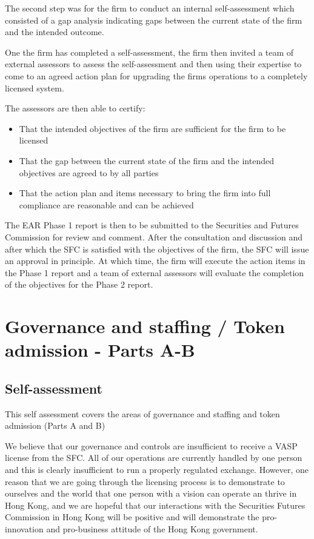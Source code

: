 \documentclass[]{report}
\begin{document}
The second step was for the firm to conduct an internal
self-assessment which consisted of a gap analysis indicating gaps
between the current state of the firm and the intended outcome.

One the firm has completed a self-assessment, the firm then invited a
team of external assessors to assess the self-assessment and then
using their expertise to come to an agreed action plan for upgrading
the firms operations to a completely licensed system.

The assessors are then able to certify:

\begin{itemize}
  \item That the intended objectives of the firm are sufficient for
    the firm to be licensed
  \item That the gap between the current state of the firm and the
    intended objectives are agreed to by all parties
  \item That the action plan and items necessary to bring the firm
    into full compliance are reasonable and can be achieved
\end{itemize}

The EAR Phase 1 report is then to be submitted to the Securities and
Futures Commission for review and comment.  After the consultation and
discussion and after which the SFC is satisfied with the objectives of
the firm, the SFC will issue an approval in principle.  At which time,
the firm will execute the action items in the Phase 1 report and a
team of external assessors will evaluate the completion of the
objectives for the Phase 2 report.

\section{Governance and staffing / Token admission - Parts A-B}
\subsection{Self-assessment}
This self assessment covers the areas of governance and staffing and
token admission (Parts A and B)

We believe that our governance and controls are insufficient
to receive a VASP license from the SFC.  All of our operations are
currently handled by one person and this is clearly insufficient to
run a properly regulated exchange.  However, one reason that we are
going through the licensing process is to demonstrate to ourselves and
the world that one person with a vision can operate an thrive in Hong
Kong, and we are hopeful that our interactions with the Securities
Futures Commission in Hong Kong will be positive and will demonstrate
the pro-innovation and pro-business attitude of the Hong Kong
government.
\end{document}
